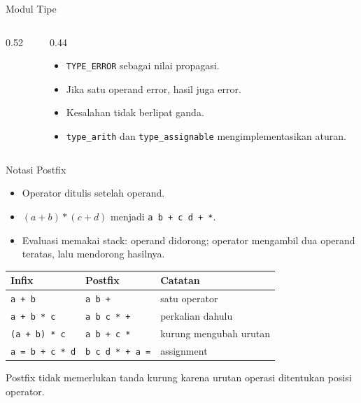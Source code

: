 \documentclass[aspectratio=169,10pt,t]{beamer}
\begin{document}
\begin{frame}[fragile]{Modul Tipe }
  \begin{columns}[T,onlytextwidth]
    \begin{column}{0.52\textwidth}
      
    \end{column}
    \begin{column}{0.44\textwidth}
      \begin{itemize}
        \item \texttt{TYPE\_ERROR} sebagai nilai propagasi.
        \item Jika satu operand error, hasil juga error.
        \item Kesalahan tidak berlipat ganda.
        \item \texttt{type\_arith} dan \texttt{type\_assignable}
              mengimplementasikan aturan.
      \end{itemize}
    \end{column}
  \end{columns}
\end{frame}

\begin{frame}{Notasi Postfix}
  \small
  \begin{itemize}
    \item Operator ditulis setelah operand.
    \item \((a+b)*(c+d)\) menjadi \texttt{a b + c d + *}.
    \item Evaluasi memakai stack: operand didorong; operator mengambil
          dua operand teratas, lalu mendorong hasilnya.
  \end{itemize}

  \vspace{3pt}
  \begin{tabular}{@{}l l l@{}}
    \toprule
    \textbf{Infix} & \textbf{Postfix} & \textbf{Catatan} \\
    \midrule
    \texttt{a + b} & \texttt{a b +} & satu operator \\
    \texttt{a + b * c} & \texttt{a b c * +} & perkalian dahulu \\
    \texttt{(a + b) * c} & \texttt{a b + c *} & kurung mengubah urutan \\
    \texttt{a = b + c * d} & \texttt{b c d * + a =} & assignment \\
    \bottomrule
  \end{tabular}

  \vspace{3pt}
  {\footnotesize\color{ubbblue!80}Postfix tidak memerlukan tanda
  kurung karena urutan operasi ditentukan posisi operator.}
\end{frame}
\end{document}
